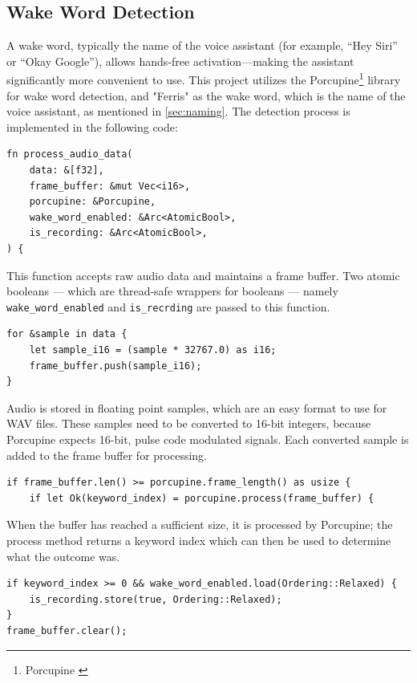 \subsection{Wake Word Detection}
A wake word, typically the name of the voice assistant (for example, “Hey Siri” or “Okay Google”),
allows hands‑free activation—making the assistant significantly more convenient to use.
This project utilizes the Porcupine\footnote{Porcupine \cite{porcupine}} library for wake word detection,
and "Ferris" as the wake word, which is the name of the voice assistant, as mentioned in \ref{sec:naming}.
The detection process is implemented in the following code:

\begin{verbatim}
fn process_audio_data(
    data: &[f32],
    frame_buffer: &mut Vec<i16>,
    porcupine: &Porcupine,
    wake_word_enabled: &Arc<AtomicBool>,
    is_recording: &Arc<AtomicBool>,
) {
\end{verbatim}

This function accepts raw audio data and maintains a frame buffer.
Two atomic booleans --- which are thread-safe wrappers for booleans ---
namely \texttt{wake\_word\_enabled} and \texttt{is\_recrding} are passed to this function.

\begin{verbatim}
for &sample in data {
    let sample_i16 = (sample * 32767.0) as i16;
    frame_buffer.push(sample_i16);
}
\end{verbatim}

Audio is stored in floating point samples, which are an easy format
to use for WAV files. These samples need to be converted to 16-bit integers,
because Porcupine expects 16-bit, pulse code modulated signals.
Each converted sample is added to the frame buffer for processing.

\begin{verbatim}
if frame_buffer.len() >= porcupine.frame_length() as usize {
    if let Ok(keyword_index) = porcupine.process(frame_buffer) {
\end{verbatim}

When the buffer has reached a sufficient size, it is processed by Porcupine;
the process method returns a keyword index which can then be used to determine what the outcome was.

\begin{verbatim}
if keyword_index >= 0 && wake_word_enabled.load(Ordering::Relaxed) {
    is_recording.store(true, Ordering::Relaxed);
}
frame_buffer.clear();
\end{verbatim}

